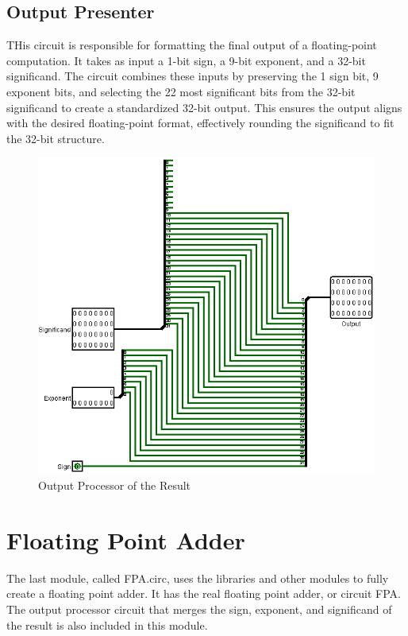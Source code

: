 \documentclass[a4paper,12pt]{article}
\begin{document}
\subsection{Output Presenter}
THis circuit is responsible for formatting the final output of a floating-point
computation. It takes as input a 1-bit sign, a 9-bit exponent, and a 32-bit
significand. The circuit combines these inputs by preserving the 1 sign bit, 9
exponent bits, and selecting the 22 most significant bits from the 32-bit
significand to create a standardized 32-bit output. This ensures the output
aligns with the desired floating-point format, effectively rounding the
significand to fit the 32-bit structure.
\begin{figure}[H]
    \centering
    \includegraphics[width=1\textwidth]{Output.png}
    \caption{Output Processor of the Result}
    \label{Output}
\end{figure}

\section{Floating Point Adder}
The last module, called FPA.circ, uses the libraries and other modules to fully
create a floating point adder. It has the real floating point adder, or circuit
FPA. The output processor circuit that merges the sign, exponent, and
significand of the result is also included in this module.
\end{document}

